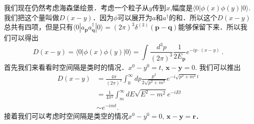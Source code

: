 
我们现在仍然考虑海森堡绘景．考虑一个粒子从$y$传到$x$,幅度是$\langle 0 |\phi(x)\phi(y)| 0 \rangle$.我们把这个量叫做$D(x-y)$．因为$\phi$可以展开为$a$和$a^\dagger$的和．所以这个$D(x-y)$总共有四项，但是只有$\langle 0 | a_{\mathbf p} a^\dagger_{\mathbf q} | 0 \rangle = (2\pi)^3 \delta^{(3)}(\mathbf p - \mathbf q)$能够保留下来．所以我们可以得出
\begin{equation}
D(x-y)=\langle 0|\phi(x) \phi(y)| 0\rangle=\int \frac{d^{3} p}{(2 \pi)^{3}} \frac{1}{2 E_{\mathbf{p}}} e^{-i p \cdot(x-y)}~.
\end{equation}
首先我们来看看时空间隔是类时的情况．$x^0 - y^0 = t$, $\mathbf x - \mathbf y = 0$. 我们可以推出
\begin{equation}
\begin{aligned}
D(x-y) &=\frac{4 \pi}{(2 \pi)^{3}} \int_{0}^{\infty} d p \frac{p^{2}}{2 \sqrt{p^{2}+m^{2}}} e^{-i \sqrt{p^{2}+m^{2}} t} \\
&=\frac{1}{4 \pi^{2}} \int_{m}^{\infty} d E \sqrt{E^{2}-m^{2}} e^{-i E t} \\
& \sim e^{-i m t} .
\end{aligned}
\end{equation}
接着我们可以考虑时空间隔是类空的情况$x^0 - y^0 = 0$, $\mathbf x - \mathbf y = \mathbf r$．
